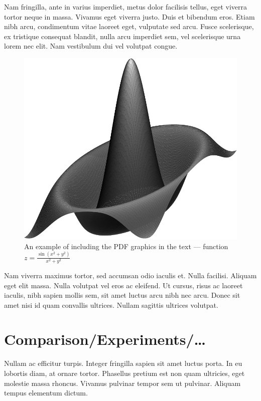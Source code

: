\documentclass[10pt]{article}
\begin{document}
Nam fringilla, ante in varius imperdiet, metus dolor facilisis tellus, eget viverra tortor neque in massa. Vivamus eget viverra justo. Duis et bibendum eros. Etiam nibh arcu, condimentum vitae laoreet eget, vulputate sed arcu. Fusce scelerisque, ex tristique consequat blandit, nulla arcu imperdiet sem, vel scelerisque urna lorem nec elit. Nam vestibulum dui vel volutpat congue.

\begin{figure}[!ht]
\centering
\includegraphics[scale=.4]{surfz}
\caption{An example of including the PDF graphics in the text ---
function $z=\frac{\sin(x^2+y^2)}{x^2+y^2}$}
\label{rys:surf}
\end{figure}

Nam viverra maximus tortor, sed accumsan odio iaculis et. Nulla facilisi. Aliquam eget elit massa. Nulla volutpat vel eros ac eleifend. Ut cursus, risus ac laoreet iaculis, nibh sapien mollis sem, sit amet luctus arcu nibh nec arcu. Donec sit amet nisi id quam convallis ultrices. Nullam sagittis ultrices volutpat. 

\section{Comparison/Experiments/\ldots}

Nullam ac efficitur turpis. Integer fringilla sapien sit amet luctus porta. In eu lobortis diam, at ornare tortor. Phasellus pretium est non quam ultricies, eget molestie massa rhoncus. Vivamus pulvinar tempor sem ut pulvinar. Aliquam tempus elementum dictum.
\end{document}
